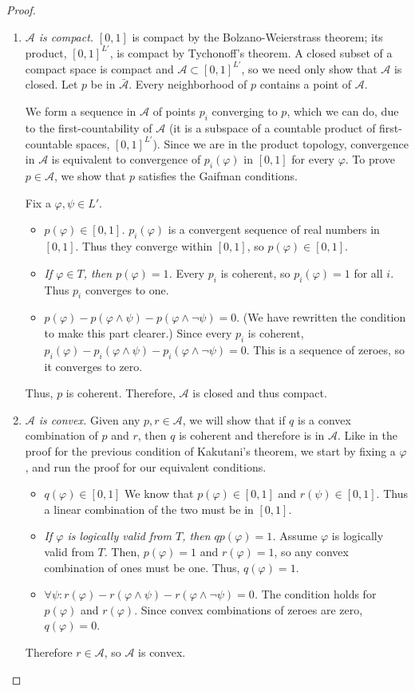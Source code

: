\documentclass[12pt]{article}
\newcommand{\vp}{\varphi}
\theoremstyle{plain}
\theoremstyle{definition}
\theoremstyle{remark}
\begin{document}
\begin{proof}
\begin{enumerate}
\item \emph{$\mathcal{A}$ is compact.}
$[0,1]$ is compact by the Bolzano-Weierstrass theorem; its product, $[0,1]^{L'}$, is compact by Tychonoff's theorem.
A closed subset of a compact space is compact and $\mathcal{A}\subset [0,1]^{L'}$, so we need only show that $\mathcal{A}$ is closed.
Let $p$ be in $\bar{\mathcal{A}}$.
Every neighborhood of $p$ contains a point of $\mathcal{A}$.

We form a sequence in $\mathcal{A}$ of points $p_i$ converging to $p$, which we can do, due to the first-countability of $\mathcal{A}$ (it is a subspace of a countable product of first-countable spaces, $[0,1]^{L'}$).
Since we are in the product topology, convergence in $\mathcal{A}$ is equivalent to convergence of $p_i(\vp)$ in $[0,1]$ for every $\vp$.
To prove $p\in\mathcal{A}$, we show that $p$ satisfies the Gaifman conditions.

Fix a $\vp,\psi\in L'$.
\begin{itemize}
\item \emph{$p(\vp)\in [0,1]$.}
$p_i(\vp)$ is a convergent sequence of real numbers in $[0, 1]$.
Thus they converge within $[0,1]$, so $p(\vp)\in[0,1]$.
\item \emph{If $\vp\in T$, then $p(\vp)=1$.}
Every $p_i$ is coherent, so $p_i(\vp)=1$ for all $i$. Thus $p_i$ converges to one.
\item $p(\vp)-p(\vp\wedge\psi)-p(\vp\wedge\neg\psi)=0$.
(We have rewritten the condition to make this part clearer.)
Since every $p_i$ is coherent, $p_i(\vp) -p_i(\vp\wedge\psi)-p_i(\vp\wedge\neg\psi)=0.$
This is a sequence of zeroes, so it converges to zero.
\end{itemize}
Thus, $p$ is coherent. Therefore, $\mathcal{A}$ is closed and thus compact.


\item \emph{$\mathcal{A}$ is convex.}
Given any $p,r\in\mathcal{A}$, we will show that if $q$ is a convex combination of $p$ and $r$, then $q$ is coherent and therefore is in $\mathcal{A}$.
Like in the proof for the previous condition of Kakutani's theorem, we start by fixing a $\vp$, and run the proof for our equivalent conditions.
\begin{itemize}
\item \emph{$q(\vp) \in [0, 1]$}
We know that $p(\vp) \in [0,1]$ and $r(\psi) \in [0,1]$.
Thus a linear combination of the two must be in $[0,1]$.
\item \emph{If $\vp$ is logically valid from $T$, then $qp(\vp)=1$.}
Assume $\vp$ is logically valid from $T$.
Then, $p(\vp)=1$ and $r(\vp)=1$, so any convex combination of ones must be one.
Thus, $q(\vp) = 1$.
\item \emph{$\forall \psi: r(\vp) -r(\vp\wedge\psi)-r(\vp\wedge\neg\psi)=0$.}
The condition holds for $p(\vp)$ and $r(\vp)$.
Since convex combinations of zeroes are zero, $q(\vp)=0$.
\end{itemize}
Therefore $r\in\mathcal{A}$, so $\mathcal{A}$ is convex.


\end{enumerate}
\end{proof}
\end{document}
